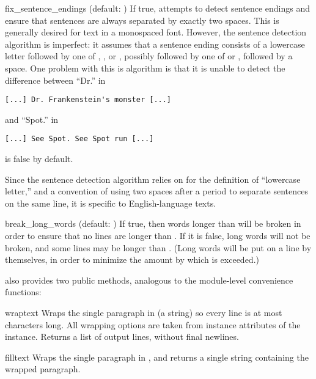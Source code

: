 \begin{memberdesc}{fix_sentence_endings}
(default: ) If true,  attempts to detect
sentence endings and ensure that sentences are always separated by
exactly two spaces.  This is generally desired for text in a monospaced
font.  However, the sentence detection algorithm is imperfect: it
assumes that a sentence ending consists of a lowercase letter followed
by one of ,
\character{!}, or , possibly followed by one of
 or , followed by a space.  One problem
with this is algorithm is that it is unable to detect the difference
between ``Dr.'' in

\begin{verbatim}
[...] Dr. Frankenstein's monster [...]
\end{verbatim}

and ``Spot.'' in

\begin{verbatim}
[...] See Spot. See Spot run [...]
\end{verbatim}

 is false by default.

Since the sentence detection algorithm relies on
 for the definition of ``lowercase letter,''
and a convention of using two spaces after a period to separate
sentences on the same line, it is specific to English-language texts.
\end{memberdesc}

\begin{memberdesc}{break_long_words}
(default: ) If true, then words longer than
 will be broken in order to ensure that no lines are
longer than .  If it is false, long words will not be
broken, and some lines may be longer than .  (Long words
will be put on a line by themselves, in order to minimize the amount
by which  is exceeded.)
\end{memberdesc}

 also provides two public methods, analogous to the
module-level convenience functions:

\begin{methoddesc}{wrap}{text}
Wraps the single paragraph in  (a string) so every line is
at most  characters long.  All wrapping options are
taken from instance attributes of the  instance.
Returns a list of output lines, without final newlines.
\end{methoddesc}

\begin{methoddesc}{fill}{text}
Wraps the single paragraph in , and returns a single string
containing the wrapped paragraph.
\end{methoddesc}
